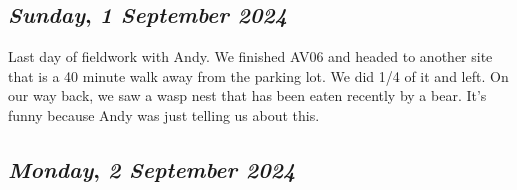 \begin{center}
\section*{\month}
\end{center}

\def\day{\textit{1 September 2024}}
\def\weekday{\textit{Sunday}}
\subsection*{\weekday, \day}
Last day of fieldwork with Andy. We finished AV06 and headed to another site that is a 40 minute walk away from the parking lot. We did 1/4 of it and left. On our way back, we saw a wasp nest that has been eaten recently by a bear. It's funny because Andy was just telling us about this. 

\def\day{\textit{2 September 2024}}
\def\weekday{\textit{Monday}}
\subsection*{\weekday, \day}